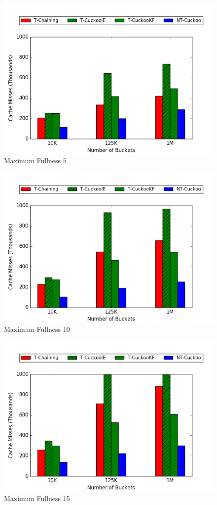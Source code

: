 \begin{figure}[H]
    \centering
        \includegraphics[width=0.75\linewidth]{maps/335cm.png}
        \caption*{Maximum Fullness 5}
\end{figure}
\begin{figure}[H]
    \centering
        \includegraphics[width=0.75\linewidth]{maps/3310cm.png}
        \caption*{Maximum Fullness 10}
\end{figure}
\begin{figure}[H]
    \centering
        \includegraphics[width=0.75\linewidth]{maps/3315cm.png}
        \caption*{Maximum Fullness 15}
\end{figure}

